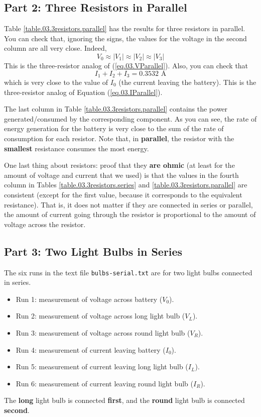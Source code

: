 \subsection{Part 2: Three Resistors in Parallel}
%
Table \ref{table.03.3resistors.parallel} has the results for three resistors in parallel. You can check that, ignoring the signs, the values for the voltage in the second column are all very close. Indeed,
\begin{equation}
	V_{0} \approx |V_{1}| \approx |V_{2}| \approx |V_{3}|
\end{equation}
This is the three-resistor analog of (\ref{eq.03.VParallel}). Also, you can check that
\begin{equation}
	I_{1} + I_{2} + I_{3}  = 0.3532 \text{ A}
\end{equation}
which is very close to the value of $I_{0}$ (the current leaving the battery). This is the three-resistor analog of Equation (\ref{eq.03.IParallel}).

The last column in Table \ref{table.03.3resistors.parallel} contains the power generated/consumed by the corresponding component. As you can see, the rate of energy generation for the battery is very close to the sum of the rate of consumption for each resistor. Note that, in \textbf{parallel}, the resistor with the \textbf{smallest} resistance consumes the most energy.

One last thing about resistors: proof that they \textbf{are ohmic} (at least for the amount of voltage and current that we used) is that the values in the fourth column in Tables \ref{table.03.3resistors.series} and \ref{table.03.3resistors.parallel} are consistent (except for the first value, because it corresponds to the equivalent resistance). That is, it does not matter if they are connected in series or parallel, the amount of current going through the resistor is proportional to the amount of voltage across the resistor.
%
\subsection{Part 3: Two Light Bulbs in Series}
%
The six runs in the text file \texttt{bulbs-serial.txt} are for two light bulbs connected in series.
\begin{itemize}
	\item Run 1: measurement of voltage across battery ($V_{0}$).
	\item Run 2: measurement of voltage across long light bulb ($V_{L}$).
	\item Run 3: measurement of voltage across round light bulb ($V_{R}$).
	\item Run 4: measurement of current leaving battery ($I_{0}$).
	\item Run 5: measurement of current leaving long light bulb ($I_{L}$).
	\item Run 6: measurement of current leaving round light bulb ($I_{R}$).
\end{itemize}
The \textbf{long} light bulb is connected \textbf{first}, and the \textbf{round} light bulb is connected \textbf{second}.
%

